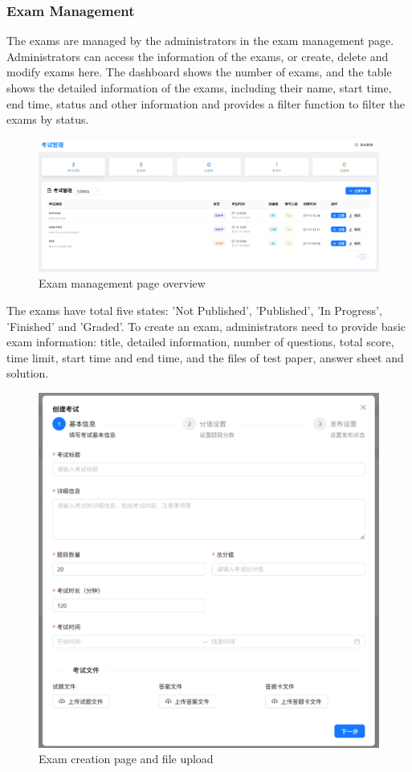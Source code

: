 \documentclass[12pt]{article}
\begin{document}
\subsubsection{Exam Management}
The exams are managed by the administrators in the exam management page. Administrators can access the information of the exams, or create, delete and modify exams here.
The dashboard shows the number of exams, and the table shows the detailed information of the exams, including their name, start time, end time, status and other information and
provides a filter function to filter the exams by status.
\begin{figure}[H]
    \centering
    \includegraphics[width=\textwidth]{admin/exammanage.png}
    \caption{Exam management page overview}
    \label{fig:ExamManagement page}
\end{figure}
The exams have total five states: 'Not Published', 'Published', 'In Progress', 'Finished' and 'Graded'.
To create an exam, administrators need to provide basic exam information: title, detailed information, number of questions, total score,
time limit, start time and end time, and the files of test paper, answer sheet and solution.
\begin{figure}[H]
    \centering
    \includegraphics[width=\textwidth]{admin/createexam1.png}
    \caption{Exam creation page and file upload}
    \label{fig:ExamCreation page}
\end{figure}
\end{document}
